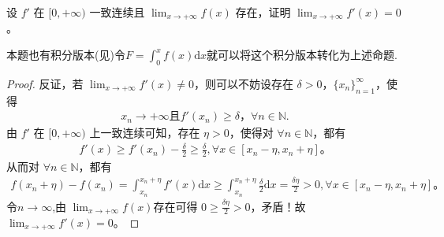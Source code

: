 \documentclass[../../main.tex]{subfiles}%
\begin{document}
\begin{proposition}\label{proposition:经典导数一致连续问题}
设 $f'$ 在 $[0,+\infty)$ 一致连续且 $\lim_{x \to +\infty} f(x)$ 存在，证明 $\lim_{x \to +\infty} f'(x) = 0$。
\end{proposition}
\begin{remark}
本题也有积分版本(见)令$F=\int_0^x{f\left( x \right) \mathrm{d}x}$就可以将这个积分版本转化为上述命题.
\end{remark}
\begin{proof}
反证，若 $\lim_{x\rightarrow +\infty} f'(x) \ne 0$，则可以不妨设存在 $\delta >0$，$\{ x_n \}_{n=1}^{\infty}$，使得
\begin{align*}
x_n\rightarrow +\infty \text{且} f'(x_n) \geqslant \delta，\forall n\in \mathbb{N}.    
\end{align*}
由 $f'$ 在 $[0,+\infty)$ 上一致连续可知，存在 $\eta >0$，使得对 $\forall n\in \mathbb{N}$，都有
\begin{align*}
f'(x) \geqslant f'(x_n) -\frac{\delta}{2} \geqslant \frac{\delta}{2}, \forall x\in [x_n-\eta ,x_n+\eta] 。
\end{align*}
从而对 $\forall n\in \mathbb{N}$，都有
\begin{align*}
f(x_n+\eta) -f(x_n) =\int_{x_n}^{x_n+\eta} f'(x) \mathrm{d}x \geqslant \int_{x_n}^{x_n+\eta} \frac{\delta}{2} \mathrm{d}x = \frac{\delta \eta}{2} > 0, \forall x\in [x_n-\eta ,x_n+\eta] 。
\end{align*}
令$n\rightarrow \infty$,由 $\lim_{x\rightarrow +\infty} f(x) $存在可得 $0 \geqslant \frac{\delta \eta}{2} > 0$，矛盾！故 $\lim_{x\rightarrow +\infty} f'(x) =0$。
\end{proof}
\end{document}
